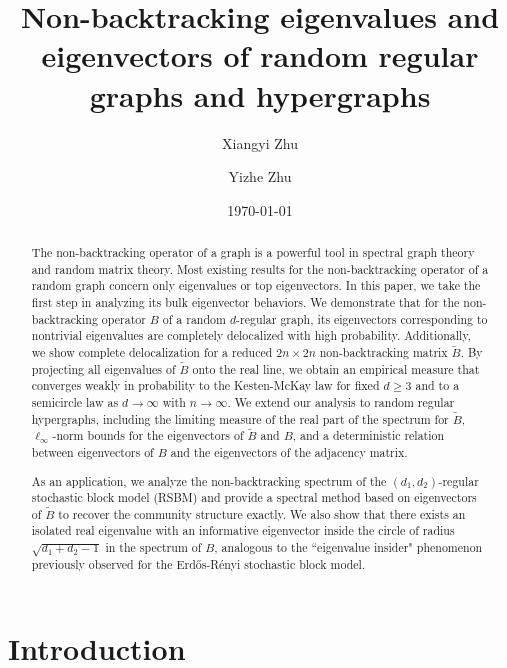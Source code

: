 \documentclass[11pt,reqno]{amsart}
\title{Non-backtracking eigenvalues and eigenvectors of random regular graphs and hypergraphs}
\author{Xiangyi Zhu}
\author{Yizhe Zhu}
\date{\today}
\theoremstyle{definition}
\begin{document}
\maketitle

\begin{abstract}
The non-backtracking operator of a graph is a powerful tool in spectral graph theory and random matrix theory. Most existing results for the non-backtracking operator of a random graph concern only eigenvalues or top eigenvectors. In this paper, we take the first step in analyzing its bulk eigenvector behaviors. We demonstrate that for the non-backtracking operator $B$ of a random $d$-regular graph, its eigenvectors corresponding to nontrivial eigenvalues are completely delocalized with high probability. Additionally, we show complete delocalization for a reduced $2n \times 2n$ non-backtracking matrix $\tilde{B}$. By projecting all eigenvalues of $\tilde{B}$ onto the real line, we obtain an empirical measure that converges weakly in probability to the Kesten-McKay law for fixed $d\geq 3$ and to a semicircle law as $d \to\infty$  with $n \to\infty$.
We extend our analysis to random regular hypergraphs, including the limiting measure of the real part of the spectrum for $\tilde B$, $\ell_{\infty}$-norm bounds for the eigenvectors of $\tilde B$ and $B$, and a deterministic relation between eigenvectors of $B$ and the eigenvectors of the adjacency matrix. 

As an application, we analyze the non-backtracking spectrum of the $(d_1,d_2)$-regular stochastic block model (RSBM) and provide a spectral method based on eigenvectors of $\tilde B$ to recover the community structure exactly. We also show that there exists an isolated real eigenvalue with an informative eigenvector inside the circle of radius $\sqrt{d_1+d_2-1}$ in the spectrum of $B$, analogous to the ``eigenvalue insider" phenomenon previously observed for the Erd\H{o}s-R\'{e}nyi stochastic block model.
\end{abstract}



\section{Introduction}
\end{document}
